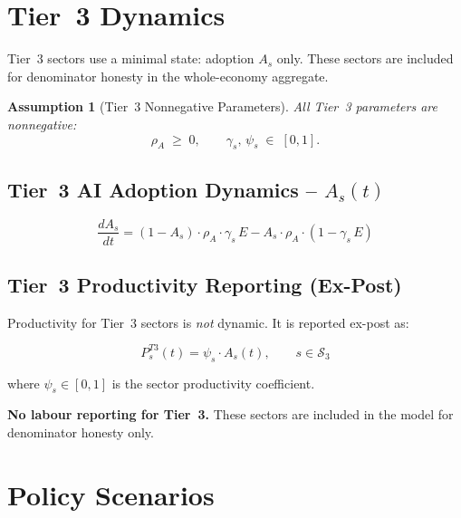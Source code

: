 \documentclass[11pt,a4paper]{article}
\newtheorem{assumption}{Assumption}
\begin{document}
\section{Tier~3 Dynamics}
\label{sec:tier3}

Tier~3 sectors use a minimal state: adoption $A_s$ only. These sectors are included for denominator honesty in the whole-economy aggregate.

\begin{assumption}[Tier~3 Nonnegative Parameters]
All Tier~3 parameters are nonnegative:
\[
\rho_A \;\geq\; 0, \qquad \gamma_s,\, \psi_s \;\in\; [0,1].
\]
\end{assumption}

\subsection{Tier~3 AI Adoption Dynamics -- \texorpdfstring{$A_s(t)$}{As(t)}}

\begin{equation}
\boxed{
\frac{dA_s}{dt}
= (1 - A_s)\cdot\rho_A\cdot\gamma_s\, E
- A_s\cdot\rho_A\cdot(1 - \gamma_s\, E)
}
\label{eq:As_T3}
\end{equation}

\subsection{Tier~3 Productivity Reporting (Ex-Post)}

Productivity for Tier~3 sectors is \emph{not} dynamic. It is reported ex-post as:

\begin{equation}
P_s^{T3}(t) = \psi_s\cdot A_s(t), \qquad s \in \mathcal{S}_3
\label{eq:Ps_T3}
\end{equation}

where $\psi_s \in [0,1]$ is the sector productivity coefficient.

\textbf{No labour reporting for Tier~3.} These sectors are included in the model for denominator honesty only.

\section{Policy Scenarios}
\label{sec:scenarios}
\end{document}

